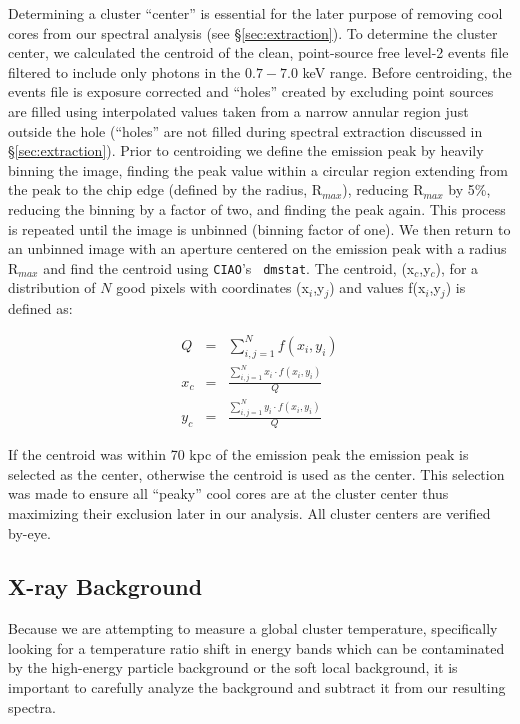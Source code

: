 \documentclass{emulateapj}
\begin{document}
Determining a cluster ``center'' is essential for the later purpose of
removing cool cores from our spectral analysis (see
\S\ref{sec:extraction}). To determine the cluster center, we
calculated the centroid of the clean, point-source
free level-2 events file filtered to include only photons in the
$0.7-7.0$ keV range. Before centroiding, the events file is exposure
corrected and ``holes'' created by excluding point sources are filled
using interpolated values taken from a narrow annular region just
outside the hole (``holes'' are not filled during spectral extraction
discussed in \S\ref{sec:extraction}). Prior to centroiding we define the emission peak by
heavily binning the image, finding the peak value within a circular
region extending from the peak to the chip edge (defined by the
radius, R$_{max}$), reducing R$_{max}$ by 5\%, reducing the binning by a
factor of two, and finding the peak again. This process is repeated
until the image is unbinned (binning factor of one). We then return to
an unbinned image with an aperture centered on the emission peak with
a radius R$_{max}$ and find the centroid using {\tt CIAO}'s {\tt
dmstat}. The centroid, (x$_c$,y$_c$), for a distribution of $N$ good
pixels with coordinates (x$_i$,y$_j$) and values f(x$_i$,y$_j$) is
defined as:

\begin{eqnarray}
Q &=& \sum_{i,j=1}^N f(x_i,y_i) \\
x_c &=& \frac{\sum_{i,j=1}^N x_i \cdot f(x_i,y_i)}{Q} \nonumber \\
y_c &=& \frac{\sum_{i,j=1}^N y_i \cdot f(x_i,y_i)}{Q} \nonumber
\end{eqnarray}

If the centroid was within 70 kpc of the emission peak the emission
peak is selected as the center, otherwise the centroid is used
as the center. This selection was made to ensure all ``peaky'' cool
cores are at the cluster center thus maximizing their exclusion later
in our analysis. All cluster centers are verified by-eye.

\subsection{X-ray Background} \label{sec:background}

Because we are attempting to measure a global cluster temperature,
specifically looking for a temperature ratio shift in energy bands
which can be contaminated by the high-energy particle background or
the soft local background, it is important to carefully analyze the
background and subtract it from our resulting spectra.
\end{document}
